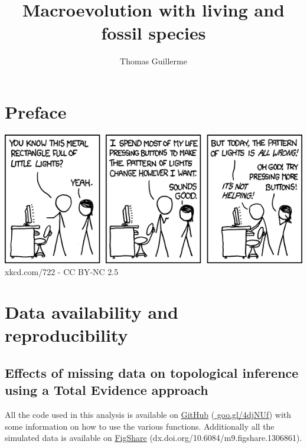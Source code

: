 \documentclass[12pt]{mythesis} %
\title{Macroevolution with living and fossil species}
\author{Thomas Guillerme}
\begin{document}
\maketitle






\newpage

\chapter*{Preface}

\vline  

\vfill
\begin{center} 
  \includegraphics[width=1\textwidth]{introduction/figures/xkcd722(CC_BY-NC_2_5).png}
    xkcd.com/722 - CC BY-NC 2.5
\end{center}
\vfill

\allcontents
\newpage


\chapter*{Data availability and reproducibility}
\section*{Effects of missing data on topological inference using a Total Evidence approach}
All the code used in this analysis is available on \href{https://github.com/TGuillerme/Total_Evidence_Method-Missing_data}{GitHub} (\href{https://github.com/TGuillerme/Total_Evidence_Method-Missing_data}{    
goo.gl/4djNUf}) with some information on how to use the various functions. Additionally all the simulated data is available on \href{http://figshare.com/articles/Effect_of_missing_data_on_topological_inference_using_a_total_evidence_approach/1306861}{FigShare} (dx.doi.org/10.6084/m9.figshare.1306861).
\end{document}
